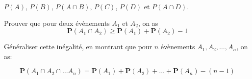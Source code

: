 \documentclass[11pt,largemargins]{homework}
\begin{document}
     $P(A)$, $P(B)$, $P(A\cap B)$, $P(C)$, $P(D)$ et $P(A\cap D)$.

\begin{arabicparts}
    \item 
Prouver que pour deux évènements $A_1$ et $A_2$, on as 
\begin{equation*}
    \mathbf{P}(A_1 \cap A_2)  \geq \mathbf{P}(A_1) + \mathbf{P}(A_2) - 1
\end{equation*}
\item Généraliser cette inégalité, en montrant que pour $n$ évènements $A_1,
    A_2,\ldots,A_n$, on as:

    \begin{equation*}
       \mathbf{P}(A_1\cap A_2\cap\ldots A_n) = \mathbf{P}(A_1) + \mathbf{P}(A_2)
       + \ldots + \mathbf{P}(A_n) - (n-1)
    \end{equation*}
\end{arabicparts}

\end{document}
